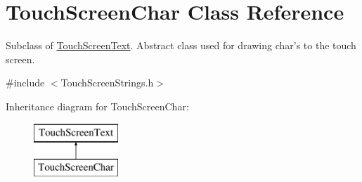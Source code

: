 \hypertarget{class_touch_screen_char}{\section{Touch\+Screen\+Char Class Reference}
\label{class_touch_screen_char}
}


Subclass of \hyperlink{class_touch_screen_text}{Touch\+Screen\+Text}. Abstract class used for drawing char's to the touch screen.  




{\ttfamily \#include $<$Touch\+Screen\+Strings.\+h$>$}

Inheritance diagram for Touch\+Screen\+Char\+:\begin{figure}[H]
\begin{center}
\leavevmode
\includegraphics[height=2.000000cm]{class_touch_screen_char}
\end{center}
\end{figure}
